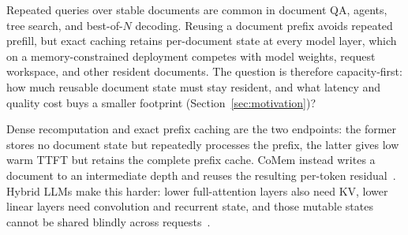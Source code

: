 \documentclass{article}
\begin{document}
Repeated queries over stable documents are common in document QA, agents, tree
search, and best-of-$N$ decoding.  Reusing a document prefix avoids repeated
prefill, but exact caching retains per-document state at every model layer,
which on a memory-constrained deployment competes with model weights, request
workspace, and other resident documents.  The question is therefore
capacity-first: how much reusable document state must stay resident, and what
latency and quality cost buys a smaller footprint
(Section~\ref{sec:motivation})?

Dense recomputation and exact prefix caching are the two endpoints: the former
stores no document state but repeatedly processes the prefix, the latter gives
low warm TTFT but retains the complete prefix cache.  CoMem instead writes a
document to an intermediate depth and reuses the resulting per-token
residual~\citep{liu2026comem,liu2026understanding}.  Hybrid LLMs make this
harder: lower full-attention layers also need KV, lower linear layers need
convolution and recurrent state, and those mutable states cannot be shared
blindly across requests~\citep{yang2025gateddeltanet,lieber2025jamba}.
\end{document}
